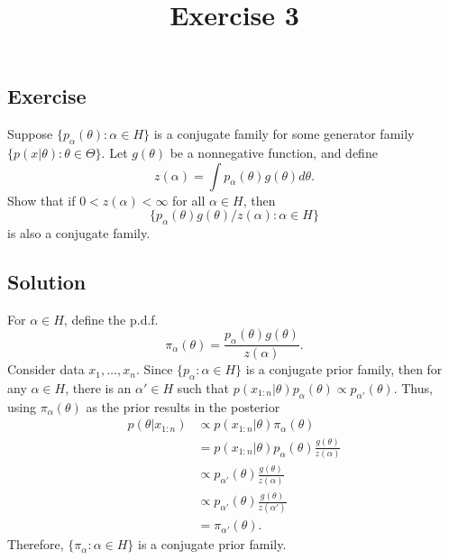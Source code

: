 \documentclass[12pt]{article}
\title{Exercise 3}
\author{}
\date{}
\begin{document}
\maketitle



\subsection*{Exercise}
Suppose $\{p_\alpha(\theta):\alpha\in H\}$ is a conjugate family for some generator family $\{p(x|\theta):\theta\in\Theta\}$.  Let $g(\theta)$ be a nonnegative function, and define
$$z(\alpha) =\int p_\alpha(\theta) g(\theta) d\theta.$$
Show that if $0<z(\alpha)<\infty$ for all $\alpha\in H$, then
$$\big\{p_\alpha(\theta)g(\theta)/z(\alpha) : \alpha\in H\big\}$$
is also a conjugate family.



\newpage
\vfill
\begin{minipage}[t][\textheight][t]{\textwidth}
\subsection*{Solution}\scriptsize
For $\alpha\in H$, define the p.d.f.
$$\pi_\alpha(\theta) = \frac{p_\alpha(\theta) g(\theta)}{z(\alpha)}. $$
Consider data $x_1,\dotsc,x_n$. Since $\{p_\alpha:\alpha\in H\}$ is a conjugate prior family, then  for any $\alpha\in H$, there is an $\alpha'\in H$ such that $p(x_{1:n}|\theta) p_\alpha(\theta)\propto p_{\alpha'}(\theta)$.
Thus, using $\pi_\alpha(\theta)$ as the prior results in the posterior
\begin{align*}
p(\theta| x_{1:n}) &\propto p(x_{1:n}|\theta)\pi_\alpha(\theta)\\
& = p(x_{1:n}|\theta)p_\alpha(\theta) \frac{g(\theta)}{z(\alpha)}\\
&\propto p_{\alpha'}(\theta) \frac{g(\theta)}{z(\alpha)}\\
&\propto p_{\alpha'}(\theta) \frac{g(\theta)}{z(\alpha')}\\
&= \pi_{\alpha'}(\theta).
\end{align*}
Therefore, $\{\pi_\alpha:\alpha\in H\}$ is a conjugate prior family.
\end{minipage}
\end{document}
